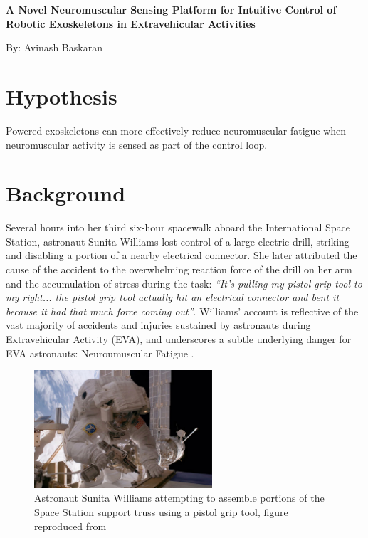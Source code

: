 \documentclass{article}
\begin{document}
\begin{center}
\LARGE \textbf{A Novel Neuromuscular Sensing Platform for Intuitive Control of Robotic Exoskeletons in Extravehicular Activities}
\normalsize
\break

By: Avinash Baskaran
\end{center}
\section{Hypothesis}

\large Powered exoskeletons can more effectively reduce neuromuscular fatigue  when neuromuscular activity is sensed as part of the control loop.

\section{Background}
Several hours into her third six-hour spacewalk aboard the International Space Station, astronaut Sunita Williams lost control of a large electric drill, striking and disabling a portion of a nearby electrical connector. She later attributed the cause of the accident to the overwhelming reaction force of the drill on her arm and the accumulation of stress during the task:  \emph{“It's pulling my pistol grip tool to my right... the pistol grip tool actually hit an electrical connector and bent it because it had that much force coming out”}. Williams' account is reflective of the vast majority of accidents and injuries sustained by astronauts during Extravehicular Activity (EVA), and underscores a subtle underlying danger for EVA astronauts: Neuroumuscular Fatigue \cite{Madden2017TheIO}.

\begin{figure}
  \begin{center}
    \includegraphics[width=0.59\textwidth]{figures/sunita williams pistol grip.pdf}
  \end{center}
  \caption{Astronaut Sunita Williams attempting to assemble portions of the Space Station support truss using a pistol grip tool, figure reproduced from \cite{SuniPistolGrip}}
\end{figure}
\end{document}
